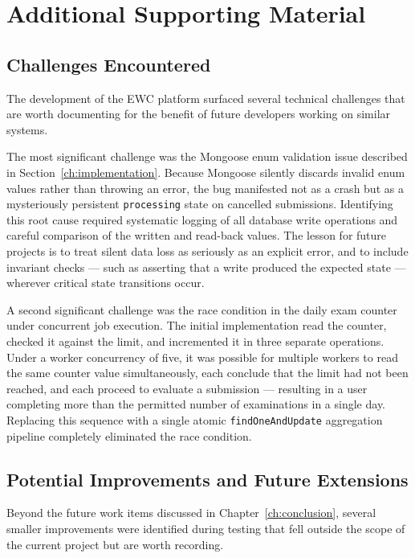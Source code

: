 \documentclass[12pt, a4paper]{report}
\begin{document}
\chapter{Additional Supporting Material}
\label{app:additional}

\section{Challenges Encountered}

The development of the EWC platform surfaced several technical challenges that are worth documenting for the benefit of future developers working on similar systems.

The most significant challenge was the Mongoose enum validation issue described in Section~\ref{ch:implementation}. Because Mongoose silently discards invalid enum values rather than throwing an error, the bug manifested not as a crash but as a mysteriously persistent \texttt{processing} state on cancelled submissions. Identifying this root cause required systematic logging of all database write operations and careful comparison of the written and read-back values. The lesson for future projects is to treat silent data loss as seriously as an explicit error, and to include invariant checks — such as asserting that a write produced the expected state — wherever critical state transitions occur.

A second significant challenge was the race condition in the daily exam counter under concurrent job execution. The initial implementation read the counter, checked it against the limit, and incremented it in three separate operations. Under a worker concurrency of five, it was possible for multiple workers to read the same counter value simultaneously, each conclude that the limit had not been reached, and each proceed to evaluate a submission — resulting in a user completing more than the permitted number of examinations in a single day. Replacing this sequence with a single atomic \texttt{findOneAndUpdate} aggregation pipeline completely eliminated the race condition.

\section{Potential Improvements and Future Extensions}

Beyond the future work items discussed in Chapter~\ref{ch:conclusion}, several smaller improvements were identified during testing that fell outside the scope of the current project but are worth recording.
\end{document}
